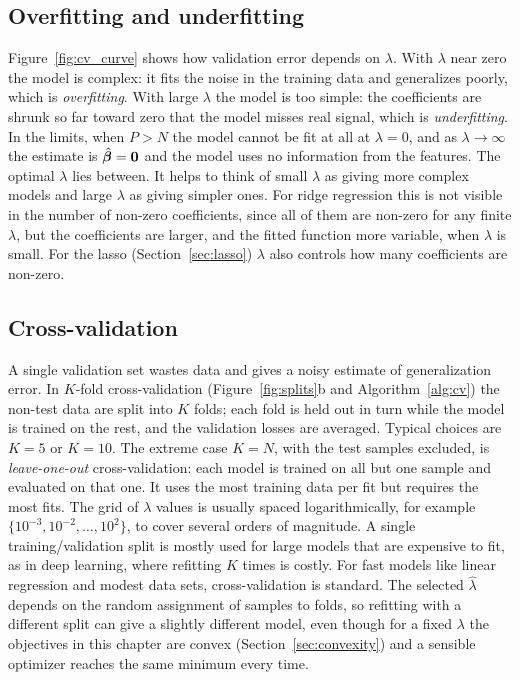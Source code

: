\subsection{Overfitting and underfitting}

Figure~\ref{fig:cv_curve} shows how validation error depends on $\lambda$. With $\lambda$ near zero the model is complex: it fits the noise in the training data and generalizes poorly, which is \emph{overfitting}. With large $\lambda$ the model is too simple: the coefficients are shrunk so far toward zero that the model misses real signal, which is \emph{underfitting}. In the limits, when $P>N$ the model cannot be fit at all at $\lambda=0$, and as $\lambda\to\infty$ the estimate is $\hat{\boldsymbol{\beta}}=\mathbf{0}$ and the model uses no information from the features. The optimal $\lambda$ lies between. It helps to think of small $\lambda$ as giving more complex models and large $\lambda$ as giving simpler ones. For ridge regression this is not visible in the number of non-zero coefficients, since all of them are non-zero for any finite $\lambda$, but the coefficients are larger, and the fitted function more variable, when $\lambda$ is small. For the lasso (Section~\ref{sec:lasso}) $\lambda$ also controls how many coefficients are non-zero.

\subsection{Cross-validation}

A single validation set wastes data and gives a noisy estimate of generalization error. In $K$-fold cross-validation (Figure~\ref{fig:splits}b and Algorithm~\ref{alg:cv}) the non-test data are split into $K$ folds; each fold is held out in turn while the model is trained on the rest, and the validation losses are averaged. Typical choices are $K=5$ or $K=10$. The extreme case $K=N$, with the test samples excluded, is \emph{leave-one-out} cross-validation: each model is trained on all but one sample and evaluated on that one. It uses the most training data per fit but requires the most fits. The grid of $\lambda$ values is usually spaced logarithmically, for example $\{10^{-3},10^{-2},\dots,10^{2}\}$, to cover several orders of magnitude. A single training/validation split is mostly used for large models that are expensive to fit, as in deep learning, where refitting $K$ times is costly. For fast models like linear regression and modest data sets, cross-validation is standard. The selected $\hat\lambda$ depends on the random assignment of samples to folds, so refitting with a different split can give a slightly different model, even though for a fixed $\lambda$ the objectives in this chapter are convex (Section~\ref{sec:convexity}) and a sensible optimizer reaches the same minimum every time.

